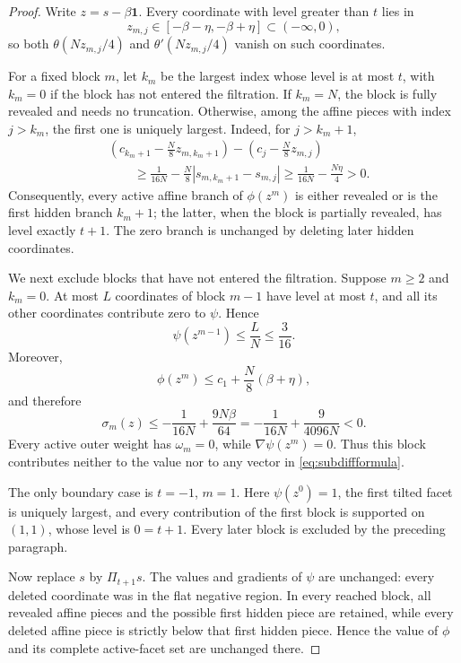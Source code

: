 \documentclass[11pt,a4paper]{article}
\newcommand{\one}{\mathbf 1}
\newcommand{\abs}[1]{\left\lvert #1\right\rvert}
\theoremstyle{definition}
\numberwithin{equation}{section}
\begin{document}
\begin{proof}
Write $z=s-\beta\one$.  Every coordinate with level greater than $t$ lies in
\[
 z_{m,j}\in[-\beta-\eta,-\beta+\eta]\subset(-\infty,0),
\]
so both $\theta(Nz_{m,j}/4)$ and $\theta'(Nz_{m,j}/4)$ vanish on such coordinates.

For a fixed block $m$, let $k_m$ be the largest index whose level is at most $t$, with $k_m=0$ if the block has not entered the filtration. If $k_m=N$, the block is fully revealed and needs no truncation. Otherwise, among the affine pieces with index $j>k_m$, the first one is uniquely largest.  Indeed, for $j>k_m+1$,
\begin{align*}
 &\left(c_{k_m+1}-\frac N8z_{m,k_m+1}\right)
 -\left(c_j-\frac N8z_{m,j}\right)\\
 &\qquad\ge\frac1{16N}-\frac N8\abs{s_{m,k_m+1}-s_{m,j}}
 \ge\frac1{16N}-\frac{N\eta}{4}>0.
\end{align*}
Consequently, every active affine branch of $\phi(z^m)$ is either revealed or is the first hidden branch $k_m+1$; the latter, when the block is partially revealed, has level exactly $t+1$.  The zero branch is unchanged by deleting later hidden coordinates.

We next exclude blocks that have not entered the filtration.  Suppose $m\ge2$ and $k_m=0$.  At most $L$ coordinates of block $m-1$ have level at most $t$, and all its other coordinates contribute zero to $\psi$.  Hence
\[
 \psi(z^{m-1})\le\frac LN\le\frac3{16}.
\]
Moreover,
\[
 \phi(z^m)\le c_1+\frac N8(\beta+\eta),
\]
and therefore
\[
 \sigma_m(z)
 \le-\frac1{16N}+\frac{9N\beta}{64}
 =-\frac1{16N}+\frac9{4096N}<0.
\]
Every active outer weight has $\omega_m=0$, while $\nabla\psi(z^m)=0$.  Thus this block contributes neither to the value nor to any vector in \eqref{eq:subdiffformula}.

The only boundary case is $t=-1$, $m=1$.  Here $\psi(z^0)=1$, the first tilted facet is uniquely largest, and every contribution of the first block is supported on $(1,1)$, whose level is $0=t+1$.  Every later block is excluded by the preceding paragraph.

Now replace $s$ by $\Pi_{t+1}s$.  The values and gradients of $\psi$ are unchanged: every deleted coordinate was in the flat negative region.  In every reached block, all revealed affine pieces and the possible first hidden piece are retained, while every deleted affine piece is strictly below that first hidden piece.  Hence the value of $\phi$ and its complete active-facet set are unchanged there.


\end{proof}
\end{document}
